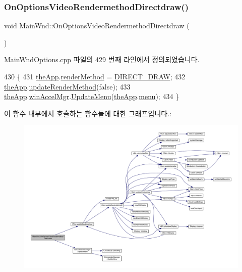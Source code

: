 \subsubsection{\texorpdfstring{On\+Options\+Video\+Rendermethod\+Directdraw()}{OnOptionsVideoRendermethodDirectdraw()}}
{\footnotesize\ttfamily void Main\+Wnd\+::\+On\+Options\+Video\+Rendermethod\+Directdraw (\begin{DoxyParamCaption}{ }\end{DoxyParamCaption})\hspace{0.3cm}{\ttfamily [protected]}}



Main\+Wnd\+Options.\+cpp 파일의 429 번째 라인에서 정의되었습니다.


\begin{DoxyCode}
430 \{
431   \mbox{\hyperlink{_v_b_a_8cpp_a8095a9d06b37a7efe3723f3218ad8fb3}{theApp}}.\mbox{\hyperlink{class_v_b_a_ae31026d8986a7658f3aaa46fba9de663}{renderMethod}} = \mbox{\hyperlink{_display_8h_aa50f63b0688d0250e0be64d8401d09a0a6673ac9056900ae119f5b5cb24c5fde6}{DIRECT\_DRAW}};
432   \mbox{\hyperlink{_v_b_a_8cpp_a8095a9d06b37a7efe3723f3218ad8fb3}{theApp}}.\mbox{\hyperlink{class_v_b_a_a1d5b9c4597d5c565ce4d8ba1e594a89f}{updateRenderMethod}}(\textcolor{keyword}{false});
433   \mbox{\hyperlink{_v_b_a_8cpp_a8095a9d06b37a7efe3723f3218ad8fb3}{theApp}}.\mbox{\hyperlink{class_v_b_a_ad7ebce057dbde0ca88cee75e84721a89}{winAccelMgr}}.\mbox{\hyperlink{class_c_accelerator_manager_ac7411d20f413ea0ec3bd65705b564adf}{UpdateMenu}}(\mbox{\hyperlink{_v_b_a_8cpp_a8095a9d06b37a7efe3723f3218ad8fb3}{theApp}}.\mbox{\hyperlink{class_v_b_a_acf9d855b5b959a2df9c6cb21b888366e}{menu}});
434 \}
\end{DoxyCode}
이 함수 내부에서 호출하는 함수들에 대한 그래프입니다.\+:
\nopagebreak
\begin{figure}[H]
\begin{center}
\leavevmode
\includegraphics[width=350pt]{class_main_wnd_a09d758ad2d47abea0fbed2f778501958_cgraph}
\end{center}
\end{figure}
\mbox{\label{class_main_wnd_a0418a1b43cf05159e2e0679bc538e669}} 
